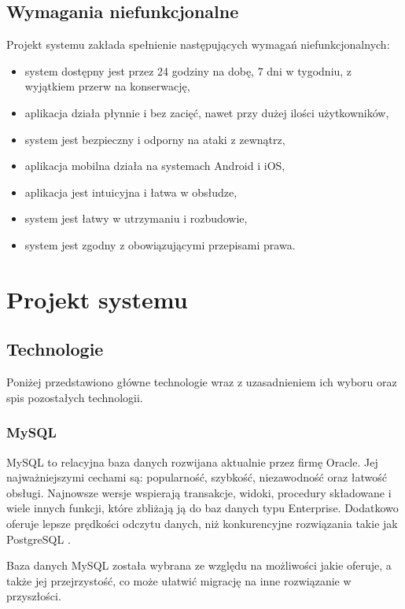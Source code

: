 \subsection{Wymagania niefunkcjonalne}

Projekt systemu zakłada spełnienie następujących wymagań niefunkcjonalnych:

\begin{itemize}
    \item system dostępny jest przez 24 godziny na dobę, 7 dni w tygodniu, z wyjątkiem przerw na konserwację,
    \item aplikacja działa płynnie i bez zacięć, nawet przy dużej ilości użytkowników,
    \item system jest bezpieczny i odporny na ataki z zewnątrz,
    \item aplikacja mobilna działa na systemach Android i iOS,
    \item aplikacja jest intuicyjna i łatwa w obsłudze,
    \item system jest łatwy w utrzymaniu i rozbudowie,
    \item system jest zgodny z obowiązującymi przepisami prawa.
\end{itemize}

\section{Projekt systemu}

\subsection{Technologie}

Poniżej przedstawiono główne technologie wraz z uzasadnieniem ich wyboru oraz spis pozostałych technologii.

\subsubsection*{MySQL}

MySQL to relacyjna baza danych rozwijana aktualnie przez firmę Oracle. Jej najważniejszymi cechami są: popularność, szybkość, niezawodność oraz łatwość obsługi. Najnowsze wersje wspierają transakcje, widoki, procedury składowane i wiele innych funkcji, które zbliżają ją do baz danych typu Enterprise. Dodatkowo oferuje lepsze prędkości odczytu danych, niż konkurencyjne rozwiązania takie jak PostgreSQL \cite{bib:mysql}.

Baza danych MySQL została wybrana ze względu na możliwości jakie oferuje, a także jej przejrzystość, co może ułatwić migrację na inne rozwiązanie w przyszłości.

